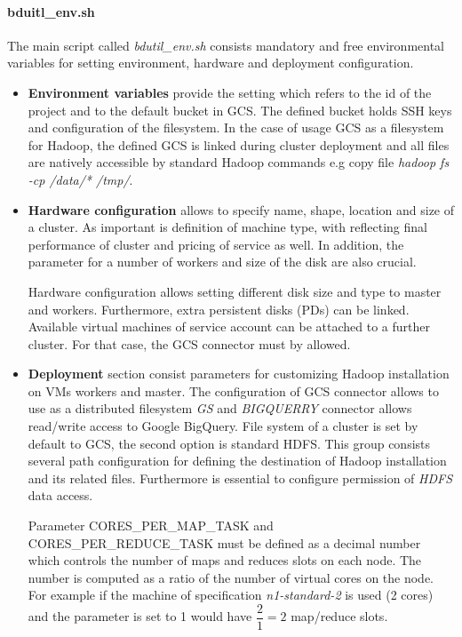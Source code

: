 \documentclass[a4paper,12pt,oneside]{report}
\begin{document}
	
	
	\paragraph{bduitl\_env.sh}\label{bdutilenv}The main script called
	\textit{bdutil\_env.sh} consists mandatory 	and free environmental variables for setting environment, hardware and deployment configuration.
	
	\begin{itemize}
		\item \textbf{Environment variables} provide the setting which refers to the id
		of the project and to 	the default bucket in GCS. The defined bucket holds SSH keys and configuration of the filesystem. In the case of usage GCS as a filesystem for Hadoop, the defined GCS is linked during cluster deployment and all files are natively accessible by standard Hadoop commands e.g copy file \textit{hadoop fs -cp  /data/* /tmp/}.
		
		\item \textbf{Hardware configuration}
		allows to specify name, shape, location and size of a cluster. As important is
		definition of machine type, with reflecting final performance of cluster and 
		pricing of service as well. In addition, the parameter 
		for a number of workers and size of the disk are also crucial.
		
		Hardware configuration allows setting different disk size and  type to
		master and workers. Furthermore, extra persistent disks (PDs) can be linked.
		Available virtual machines of service	account can be attached to a further 
		cluster. For that case, the GCS connector must by allowed.
		
		\item \textbf{Deployment} section consist parameters for customizing Hadoop
		installation on VMs workers and master. The configuration of GCS connector 
		allows to use as a distributed filesystem \textit{GS} and \textit{BIGQUERRY}
		connector allows read/write access to Google BigQuery. File
		system of a cluster is set by default to GCS, the second 
		option is standard HDFS. This group consists several path configuration for
		defining the destination of Hadoop installation and its related files. 
		Furthermore is essential to configure permission  of \textit{HDFS} data access.
		
		Parameter CORES\_PER\_MAP\_TASK and CORES\_PER\_REDUCE\_TASK must be defined as
		a decimal number which controls the number of maps and reduces slots on each node. 
		The number is computed as a ratio of the number of virtual cores on the node. 
		For example if the machine of specification \textit{ n1-standard-2} 
		is used (2 cores) and the parameter is set to 1 would have $\dfrac{2}{1} = 2$
		map/reduce slots.
	\end{itemize}
	
\end{document}
